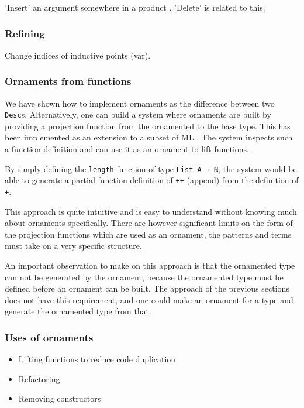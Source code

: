 'Insert' an argument somewhere in a product \cite{dagand14-transporting}.
'Delete' is related to this.

\subsubsection{Refining}

Change indices of inductive points (var).

\subsubsection{Ornaments from functions}

We have shown how to implement ornaments as the difference between two
\texttt{Desc}s.
Alternatively, one can build a system where ornaments are built by
providing a projection function from the ornamented to the base type.
This has been implemented as an extension to a subset of ML
\cite{williams14}.
The system inspects such a function definition and can use it as an
ornament to lift functions.

\begin{example}
By simply defining the \texttt{length} function of type \texttt{List A
  → ℕ}, the system would be able to generate a partial function
definition of \texttt{++} (append) from the definition of \texttt{+}.
\end{example}

This approach is quite intuitive and is easy to understand without
knowing much about ornaments specifically.
There are however significant limits on the form of the projection
functions which are used as an ornament, the patterns and terms must
take on a very specific structure.

An important observation to make on this approach is that the
ornamented type can not be generated by the ornament, because the
ornamented type must be defined before an ornament can be built.
The approach of the previous sections does not have this requirement,
and one could make an ornament for a type and generate the ornamented
type from that.

\subsubsection{Uses of ornaments}


\begin{itemize}
\item Lifting functions to reduce code duplication
\item Refactoring
\item Removing constructors
\end{itemize}

\cite{williams14}
